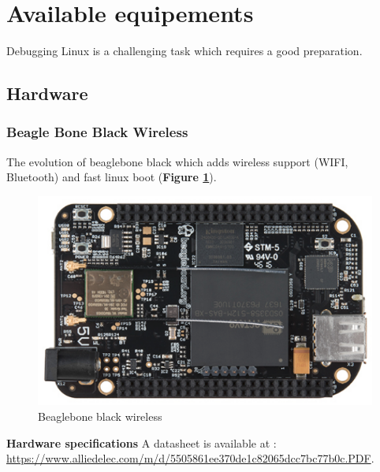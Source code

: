 \section{Available equipements}
Debugging Linux is a challenging task which requires a good preparation.
\subsection{Hardware}


\subsubsection{Beagle Bone Black Wireless} 
The evolution of beaglebone black which adds wireless support (WIFI, Bluetooth) and fast linux boot (\textbf{Figure \ref{Beaglebone black wireless}}). 
		\begin{figure}[H]
			\centering
        	\includegraphics[scale=0.25]{img/mean/beaglebone-black-wireless.png}
        	\caption{Beaglebone black wireless}
        	\label{Beaglebone black wireless}
    	\end{figure}
\begin{center}
\textbf{\color{red}Hardware specifications} 
A datasheet is available at : {\color{blue}\url{https://www.alliedelec.com/m/d/5505861ee370de1c82065dcc7bc77b0c.PDF}}.
\end{center}

